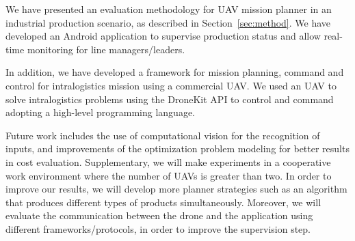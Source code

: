 \documentclass[12pt]{article}
\begin{document}
We have presented an evaluation methodology for UAV mission planner in an industrial production scenario, as described in Section~\ref{sec:method}. We have developed an Android application to supervise production status and allow real-time monitoring for line managers/leaders.
 
In addition, we have developed a framework for mission planning, command and control for intralogistics mission using a commercial UAV. We used an UAV to solve intralogistics problems using the DroneKit API to control and command adopting a high-level programming language.

Future work includes the use of computational vision for the recognition of inputs, and improvements of the optimization problem modeling for better results in cost evaluation. Supplementary, we will make experiments in a cooperative work environment where the number of UAVs is greater than two. In order to improve our results, we will develop more planner strategies such as an algorithm that produces different types of products simultaneously. Moreover, we will evaluate the communication between the drone and the application using different frameworks/protocols, in order to improve the supervision step.



\end{document}
